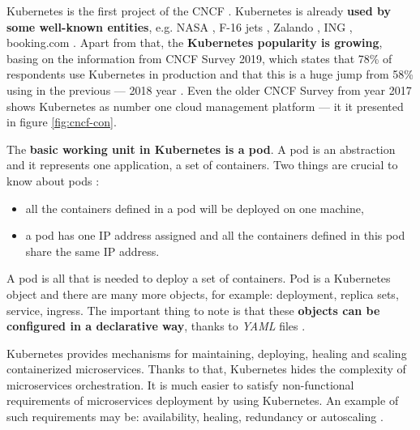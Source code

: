 Kubernetes is the first project of the CNCF \cite{article-state-machine}. Kubernetes is already \textbf{used by some well-known entities}, e.g. NASA \cite{nasa}, F-16 jets \cite{online-f16}, Zalando \cite{online-zalando}, ING \cite{online-ing}, booking.com \cite{online-bookingcom}. Apart from that, the \textbf{Kubernetes popularity is growing}, basing on the information from CNCF Survey 2019, which states that 78\% of respondents use Kubernetes in production and that this is a huge jump from 58\% using in the previous --- 2018 year \cite{cncf-2019}. Even the older CNCF Survey from year 2017 shows Kubernetes as number one cloud management platform --- it it presented in figure \ref{fig:cncf-con}.

The \textbf{basic working unit in Kubernetes is a pod}. A pod is an abstraction and it represents one application, a set of containers. Two things are crucial to know about pods \cite{article-modelling-performance-k8s}:
\begin{itemize}
\item all the containers defined in a pod will be deployed on one machine,
\item a pod has one IP address assigned and all the containers defined in this pod share the same IP address.
\end{itemize}

A pod is all that is needed to deploy a set of containers. Pod is a Kubernetes object and there are many more objects, for example: deployment, replica sets, service, ingress. The important thing to note is that these \textbf{objects can be configured in a declarative way}, thanks to \textit{YAML} files \cite{k8s-declarative}.

Kubernetes provides mechanisms for maintaining, deploying, healing and scaling containerized microservices. Thanks to that, Kubernetes hides the complexity of microservices orchestration. It is much easier to satisfy non-functional requirements of microservices deployment by using Kubernetes. An example of such requirements may be: availability, healing, redundancy or autoscaling \cite{article-k8s-as-avail}.

